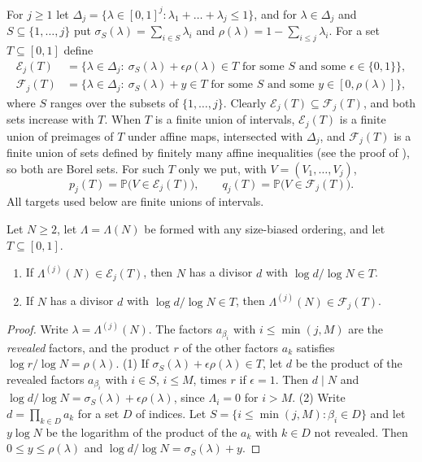 \documentclass[11pt,colorlinks]{charlie}
\newcommand{\cE}{\mathcal{E}}
\newcommand{\cF}{\mathcal{F}}
\newcommand{\Prob}{\mathbb{P}}
\begin{document}
For $j\ge1$ let $\Delta_j=\{\lambda\in[0,1]^j:\lambda_1+\dots+\lambda_j\le1\}$, and for $\lambda\in\Delta_j$ and $S\subseteq\{1,\dots,j\}$ put $\sigma_S(\lambda)=\sum_{i\in S}\lambda_i$ and $\rho(\lambda)=1-\sum_{i\le j}\lambda_i$. For a set $T\subseteq[0,1]$ define
\begin{align*}
 \cE_j(T)&=\{\lambda\in\Delta_j:\ \sigma_S(\lambda)+\epsilon\rho(\lambda)\in T\text{ for some }S\text{ and some }\epsilon\in\{0,1\}\},\\
 \cF_j(T)&=\{\lambda\in\Delta_j:\ \sigma_S(\lambda)+y\in T\text{ for some }S\text{ and some }y\in[0,\rho(\lambda)]\},
\end{align*}
where $S$ ranges over the subsets of $\{1,\dots,j\}$. Clearly $\cE_j(T)\subseteq\cF_j(T)$, and both sets increase with $T$. When $T$ is a finite union of intervals, $\cE_j(T)$ is a finite union of preimages of $T$ under affine maps, intersected with $\Delta_j$, and $\cF_j(T)$ is a finite union of sets defined by finitely many affine inequalities (see the proof of ), so both are Borel sets. For such $T$ only we put, with $V=(V_1,\dots,V_j)$,
\[
 p_j(T)=\Prob\big(V\in\cE_j(T)\big),\qquad q_j(T)=\Prob\big(V\in\cF_j(T)\big).
\]
All targets used below are finite unions of intervals.

\begin{lemma}\label{lem:divisors}
Let $N\ge2$, let $\Lambda=\Lambda(N)$ be formed with any size-biased ordering, and let $T\subseteq[0,1]$.
\begin{enumerate}
\item If $\Lambda^{(j)}(N)\in\cE_j(T)$, then $N$ has a divisor $d$ with $\log d/\log N\in T$.
\item If $N$ has a divisor $d$ with $\log d/\log N\in T$, then $\Lambda^{(j)}(N)\in\cF_j(T)$.
\end{enumerate}
\end{lemma}

\begin{proof}
Write $\lambda=\Lambda^{(j)}(N)$. The factors $a_{\beta_i}$ with $i\le\min(j,M)$ are the \emph{revealed} factors, and the product $r$ of the other factors $a_k$ satisfies $\log r/\log N=\rho(\lambda)$. (1) If $\sigma_S(\lambda)+\epsilon\rho(\lambda)\in T$, let $d$ be the product of the revealed factors $a_{\beta_i}$ with $i\in S$, $i\le M$, times $r$ if $\epsilon=1$. Then $d\mid N$ and $\log d/\log N=\sigma_S(\lambda)+\epsilon\rho(\lambda)$, since $\Lambda_i=0$ for $i>M$. (2) Write $d=\prod_{k\in D}a_k$ for a set $D$ of indices. Let $S=\{i\le\min(j,M):\beta_i\in D\}$ and let $y\log N$ be the logarithm of the product of the $a_k$ with $k\in D$ not revealed. Then $0\le y\le\rho(\lambda)$ and $\log d/\log N=\sigma_S(\lambda)+y$.
\end{proof}
\end{document}
